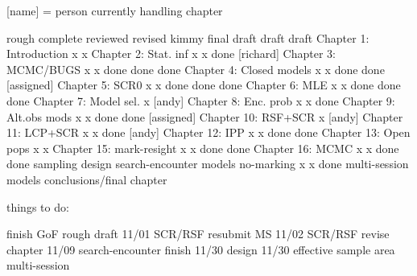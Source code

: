 [name] = person currently handling chapter


                          rough   complete reviewed  revised kimmy  final draft
                          draft    draft
Chapter 1: Introduction       x       x
Chapter 2: Stat. inf          x       x     done    [richard]
Chapter 3: MCMC/BUGS          x       x     done     done    done
Chapter 4: Closed models      x       x     done     done  [assigned]
Chapter 5: SCR0               x       x     done     done    done
Chapter 6: MLE                x       x     done     done    done
Chapter 7: Model sel.         x     [andy]
Chapter 8: Enc. prob          x       x     done
Chapter 9: Alt.obs mods       x       x     done     done   [assigned]
Chapter 10: RSF+SCR           x    [andy]
Chapter 11: LCP+SCR           x       x     done    [andy]
Chapter 12: IPP               x       x     done     done
Chapter 13: Open pops         x       x
Chapter 15: mark-resight      x       x     done     done 
Chapter 16: MCMC              x       x     done     done
sampling design     
search-encounter models
no-marking                    x       x     done
multi-session models
conclusions/final chapter





things to do:

finish GoF rough draft   11/01
SCR/RSF resubmit MS      11/02
SCR/RSF revise chapter   11/09
search-encounter finish  11/30
design                   11/30
effective sample area  
multi-session
